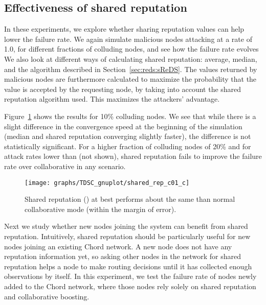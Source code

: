 \subsection{Effectiveness of shared reputation}\label{sec:results-shared}
In these experiments, we explore whether 
sharing reputation values can help lower the failure rate. We again
simulate malicious nodes attacking at a rate of 1.0, for different
fractions of colluding nodes, and see how the failure rate evolves
We also look at different ways of calculating shared reputation:
average, median, and the \sharedrep algorithm described in
Section~\ref{sec:reds:sReDS}.
The values returned by malicious nodes are furthermore calculated to
maximize the probability that the value is accepted by the requesting
node, by taking into account the shared reputation algorithm used. This
maximizes the attackers' advantage.


Figure~\ref{fig:shared0.1} shows the results for 10\% colluding
nodes. We see that while there is a slight difference in the
convergence speed at the beginning of the simulation (median and
\sharedrep shared reputation converging slightly faster), the difference
is not statistically significant. For a higher fraction of
colluding nodes of 20\% and for attack rates lower than  (not
shown), shared reputation fails to improve the failure rate over
collaborative in any scenario.

\begin{figure}[t!]
\centering 
\texttt{[image: graphs/TDSC\_gnuplot/shared\_rep\_c01\_c]}
\caption{Shared reputation () at best performs about the same
   than normal collaborative mode (within the margin of error).}
      \label{fig:shared0.1}
\end{figure}


















 Next we study whether new nodes joining the
system can benefit from shared reputation.
Intuitively, shared reputation should be particularly useful for new
nodes joining an existing Chord network. A new node does not have any
reputation information yet, so asking other nodes in the network for
shared reputation helps a node to make routing decisions until it has
collected enough observations by itself. In this experiment, we test the
failure rate of nodes newly added to the Chord network, where those
nodes rely solely on shared reputation and collaborative boosting.



